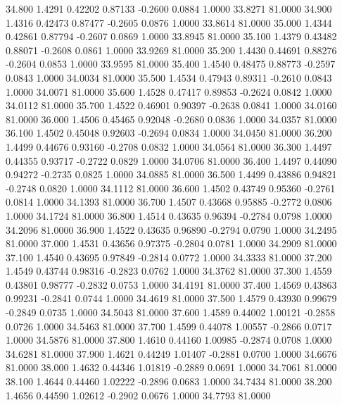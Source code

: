   34.800   1.4291   0.42202   0.87133  -0.2600   0.0884   1.0000  33.8271  81.0000
  34.900   1.4316   0.42473   0.87477  -0.2605   0.0876   1.0000  33.8614  81.0000
  35.000   1.4344   0.42861   0.87794  -0.2607   0.0869   1.0000  33.8945  81.0000
  35.100   1.4379   0.43482   0.88071  -0.2608   0.0861   1.0000  33.9269  81.0000
  35.200   1.4430   0.44691   0.88276  -0.2604   0.0853   1.0000  33.9595  81.0000
  35.400   1.4540   0.48475   0.88773  -0.2597   0.0843   1.0000  34.0034  81.0000
  35.500   1.4534   0.47943   0.89311  -0.2610   0.0843   1.0000  34.0071  81.0000
  35.600   1.4528   0.47417   0.89853  -0.2624   0.0842   1.0000  34.0112  81.0000
  35.700   1.4522   0.46901   0.90397  -0.2638   0.0841   1.0000  34.0160  81.0000
  36.000   1.4506   0.45465   0.92048  -0.2680   0.0836   1.0000  34.0357  81.0000
  36.100   1.4502   0.45048   0.92603  -0.2694   0.0834   1.0000  34.0450  81.0000
  36.200   1.4499   0.44676   0.93160  -0.2708   0.0832   1.0000  34.0564  81.0000
  36.300   1.4497   0.44355   0.93717  -0.2722   0.0829   1.0000  34.0706  81.0000
  36.400   1.4497   0.44090   0.94272  -0.2735   0.0825   1.0000  34.0885  81.0000
  36.500   1.4499   0.43886   0.94821  -0.2748   0.0820   1.0000  34.1112  81.0000
  36.600   1.4502   0.43749   0.95360  -0.2761   0.0814   1.0000  34.1393  81.0000
  36.700   1.4507   0.43668   0.95885  -0.2772   0.0806   1.0000  34.1724  81.0000
  36.800   1.4514   0.43635   0.96394  -0.2784   0.0798   1.0000  34.2096  81.0000
  36.900   1.4522   0.43635   0.96890  -0.2794   0.0790   1.0000  34.2495  81.0000
  37.000   1.4531   0.43656   0.97375  -0.2804   0.0781   1.0000  34.2909  81.0000
  37.100   1.4540   0.43695   0.97849  -0.2814   0.0772   1.0000  34.3333  81.0000
  37.200   1.4549   0.43744   0.98316  -0.2823   0.0762   1.0000  34.3762  81.0000
  37.300   1.4559   0.43801   0.98777  -0.2832   0.0753   1.0000  34.4191  81.0000
  37.400   1.4569   0.43863   0.99231  -0.2841   0.0744   1.0000  34.4619  81.0000
  37.500   1.4579   0.43930   0.99679  -0.2849   0.0735   1.0000  34.5043  81.0000
  37.600   1.4589   0.44002   1.00121  -0.2858   0.0726   1.0000  34.5463  81.0000
  37.700   1.4599   0.44078   1.00557  -0.2866   0.0717   1.0000  34.5876  81.0000
  37.800   1.4610   0.44160   1.00985  -0.2874   0.0708   1.0000  34.6281  81.0000
  37.900   1.4621   0.44249   1.01407  -0.2881   0.0700   1.0000  34.6676  81.0000
  38.000   1.4632   0.44346   1.01819  -0.2889   0.0691   1.0000  34.7061  81.0000
  38.100   1.4644   0.44460   1.02222  -0.2896   0.0683   1.0000  34.7434  81.0000
  38.200   1.4656   0.44590   1.02612  -0.2902   0.0676   1.0000  34.7793  81.0000
